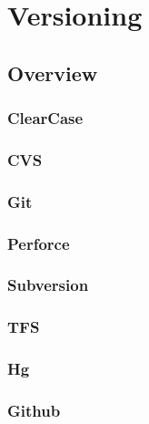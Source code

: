 \part{Versioning}


\chapter{Overview}



\section{ClearCase}



\section{CVS}



\section{Git}



\section{Perforce}



\section{Subversion}


\section{TFS}



\section{Hg}



\section{Github}







